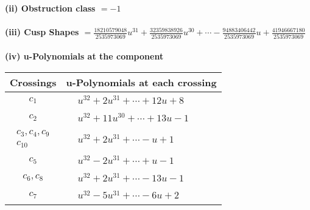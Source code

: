 \documentclass[1p]{elsarticle_modified}
\theoremstyle{definition}
\begin{document}
\flushleft \textbf{(ii) Obstruction class $= -1$}\\~\\
\flushleft \textbf{(iii) Cusp Shapes $= \frac{18210579048}{2535973069} u^{31}+\frac{32359838926}{2535973069} u^{30}+\cdots-\frac{94883406442}{2535973069} u+\frac{41946667180}{2535973069}$}\\~\\
\newpage\renewcommand{\arraystretch}{1}
\flushleft \textbf{(iv) u-Polynomials at the component}\newline \\
\begin{tabular}{m{50pt}|m{274pt}}
Crossings & \hspace{64pt}u-Polynomials at each crossing \\
\hline $$\begin{aligned}c_{1}\end{aligned}$$&$\begin{aligned}
&u^{32}+2 u^{31}+\cdots+12 u+8
\end{aligned}$\\
\hline $$\begin{aligned}c_{2}\end{aligned}$$&$\begin{aligned}
&u^{32}+11 u^{30}+\cdots+13 u-1
\end{aligned}$\\
\hline $$\begin{aligned}c_{3},c_{4},c_{9}\\c_{10}\end{aligned}$$&$\begin{aligned}
&u^{32}+2 u^{31}+\cdots- u+1
\end{aligned}$\\
\hline $$\begin{aligned}c_{5}\end{aligned}$$&$\begin{aligned}
&u^{32}-2 u^{31}+\cdots+u-1
\end{aligned}$\\
\hline $$\begin{aligned}c_{6},c_{8}\end{aligned}$$&$\begin{aligned}
&u^{32}+2 u^{31}+\cdots-13 u-1
\end{aligned}$\\
\hline $$\begin{aligned}c_{7}\end{aligned}$$&$\begin{aligned}
&u^{32}-5 u^{31}+\cdots-6 u+2
\end{aligned}$\\
\hline
\end{tabular}\\~\\
\end{document}
